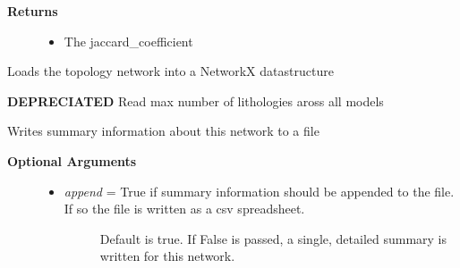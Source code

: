 \documentclass[a4paper,10pt,english]{sphinxmanual}
\begin{document}
\begin{fulllineitems}
\begin{fulllineitems}
\begin{description}
\begin{itemize}
\end{itemize}

\item[{\textbf{Returns}}] \leavevmode\begin{itemize}
\item {} 
The jaccard\_coefficient

\end{itemize}

\end{description}

\end{fulllineitems}


\begin{fulllineitems}
\label{pynoddy:pynoddy.output.NoddyTopology.loadNetwork}
Loads the topology network into a NetworkX datastructure

\end{fulllineitems}


\begin{fulllineitems}
\label{pynoddy:pynoddy.output.NoddyTopology.read_adjacency_matrix}
\textbf{DEPRECIATED}
Read max number of lithologies aross all models

\end{fulllineitems}


\begin{fulllineitems}
\label{pynoddy:pynoddy.output.NoddyTopology.read_properties}
\end{fulllineitems}


\begin{fulllineitems}
\label{pynoddy:pynoddy.output.NoddyTopology.write_summary_file}
Writes summary information about this network to a file
\begin{description}
\item[{\textbf{Optional Arguments}}] \leavevmode\begin{itemize}
\item {} \begin{description}
\item[{\emph{append} = True if summary information should be appended to the file. If so the file is written as a csv spreadsheet. }] \leavevmode
Default is true. If False is passed, a single, detailed summary is written for this network.


\end{description}
\end{itemize}
\end{description}
\end{fulllineitems}
\end{fulllineitems}
\end{document}

